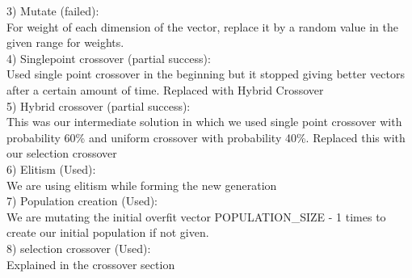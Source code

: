 \documentclass[10pt]{report}
\theoremstyle{definition}
\theoremstyle{plain}
\begin{document}
3)  Mutate (failed): \\
For weight of each dimension of the vector, replace it by a random value in the given range for weights. \\

4) Singlepoint crossover (partial success): \\
Used single point crossover in the beginning but it stopped giving better vectors after a certain amount of time. Replaced with Hybrid Crossover \\

5) Hybrid crossover (partial success): \\
This was our intermediate solution in which we used single point crossover with probability 60\% and uniform crossover with probability 40\%. Replaced this with our selection crossover \\

6) Elitism (Used): \\
We are using elitism while forming the new generation \\

7) Population creation (Used): \\
We are mutating the initial overfit vector POPULATION\_SIZE - 1 times to create our initial population if not given. \\

8) selection crossover (Used): \\
Explained in the crossover section \\

\pagebreak
\end{document}
